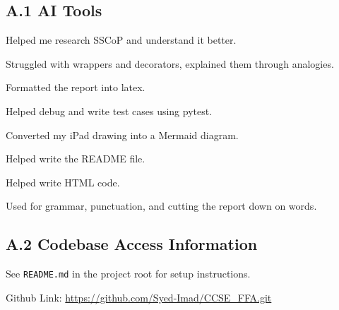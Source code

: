 \documentclass[12pt,a4paper]{article}
\begin{document}
\subsection*{A.1 AI Tools}

Helped me research SSCoP and understand it better.

Struggled with wrappers and decorators, explained them through analogies.

Formatted the report into latex.

Helped debug and write test cases using pytest.

Converted my iPad drawing into a Mermaid diagram.

Helped write the README file.

Helped write HTML code.

Used for grammar, punctuation, and cutting the report down on words.

\subsection*{A.2 Codebase Access Information}

See \lstinline|README.md| in the project root for setup instructions.

Github Link: \url{https://github.com/Syed-Imad/CCSE_FFA.git}
\end{document}
